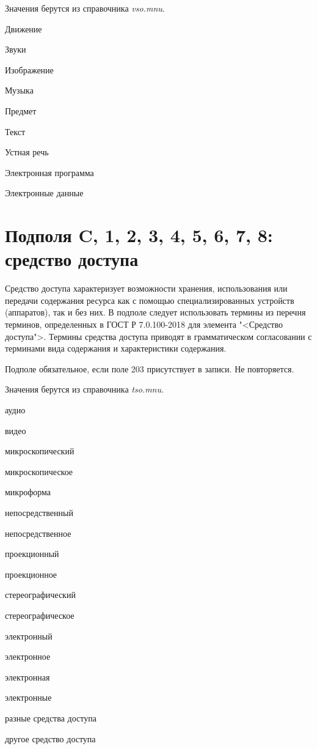 Значения берутся из справочника \emph{vso.mnu}.

\begin{cutelist}
    \item Движение
    \item Звуки
    \item Изображение
    \item Музыка
    \item Предмет
    \item Текст
    \item Устная речь
    \item Электронная программа
    \item Электронные данные
\end{cutelist}

\section{Подполя C, 1, 2, 3, 4, 5, 6, 7, 8: средство доступа }

Средство доступа характеризует возможности хранения, использования или передачи содержания ресурса как с помощью специализированных устройств (аппаратов), так и без них. В подполе следует использовать термины из перечня терминов, определенных в ГОСТ Р 7.0.100-2018 для элемента "<Средство доступа">. Термины средства доступа приводят в грамматическом согласовании с терминами вида содержания и характеристики содержания.

Подполе обязательное, если поле 203 присутствует в записи. Не повторяется.

Значения берутся из справочника \emph{tso.mnu}.

\begin{cutelist}
    \item аудио
    \item видео
    \item микроскопический
    \item микроскопическое
    \item микроформа
    \item непосредственный
    \item непосредственное
    \item проекционный
    \item проекционное
    \item стереографический
    \item стереографическое
    \item электронный
    \item электронное
    \item электронная
    \item электронные
    \item разные средства доступа
    \item другое средство доступа
\end{cutelist}

